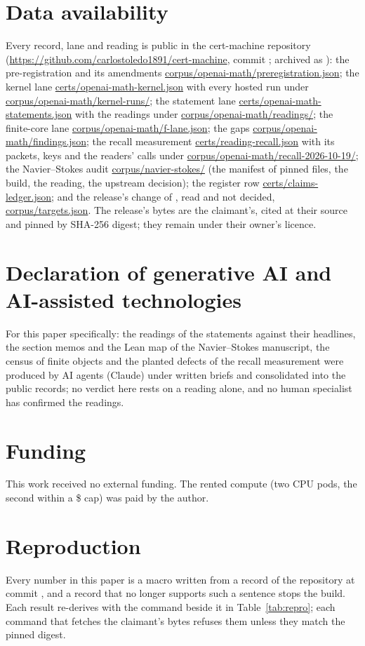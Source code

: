 \documentclass[preprint,11pt,authoryear,a4paper]{elsarticle}
\begin{document}
\section*{Data availability}
Every record, lane and reading is public in the cert-machine repository (\url{https://github.com/carlostoledo1891/cert-machine}, commit \OmCommit; archived as \citealp{CMArchive}): the pre-registration and its amendments \url{corpus/openai-math/preregistration.json}; the kernel lane \url{certs/openai-math-kernel.json} with every hosted run under \url{corpus/openai-math/kernel-runs/}; the statement lane \url{certs/openai-math-statements.json} with the readings under \url{corpus/openai-math/readings/}; the finite-core lane \url{corpus/openai-math/f-lane.json}; the gaps \url{corpus/openai-math/findings.json}; the recall measurement \url{certs/reading-recall.json} with its packets, keys and the readers' calls under \url{corpus/openai-math/recall-2026-10-19/}; the Navier--Stokes audit \url{corpus/navier-stokes/} (the manifest of pinned files, the build, the reading, the upstream decision); the register row \url{certs/claims-ledger.json}; and the release's change of \OmNextDate, read and not decided, \url{corpus/targets.json}. The release's bytes are the claimant's, cited at their source and pinned by SHA-256 digest; they remain under their owner's licence.

\section*{Declaration of generative AI and AI-assisted technologies}
\cmaideclaration{} For this paper specifically: the readings of the statements against their headlines, the \SectionMemos{} section memos and the Lean map of the Navier--Stokes manuscript, the census of finite objects and the planted defects of the recall measurement were produced by AI agents (Claude) under written briefs and consolidated into the public records; no verdict here rests on a reading alone, and no human specialist has confirmed the readings.

\section*{Funding}
This work received no external funding. The rented compute (two CPU pods, the second within a \$\OmPodTwoCap{} cap) was paid by the author.

\appendix
\section{Reproduction}\label{app:repro}\setcounter{table}{0}
Every number in this paper is a macro written from a record of the repository at commit \OmCommit, and a record that no longer supports such a sentence stops the build. Each result re-derives with the command beside it in Table~\ref{tab:repro}; each command that fetches the claimant's bytes refuses them unless they match the pinned digest.
\end{document}
